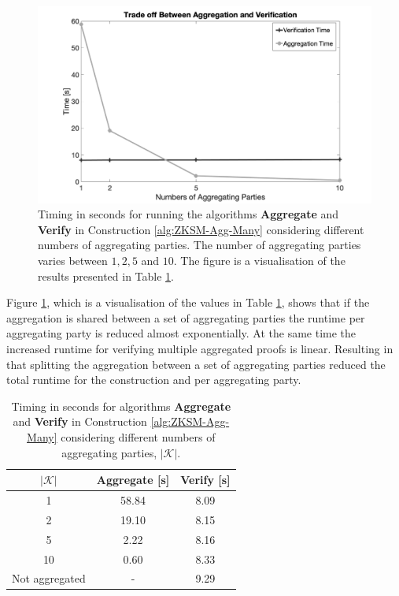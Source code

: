  \begin{figure}[]
\includegraphics[width=\linewidth]{./figure/trade-off.png}
\caption{Timing in seconds for running the algorithms  \textbf{Aggregate} and \textbf{Verify} in Construction \ref{alg:ZKSM-Agg-Many} considering different numbers of aggregating parties. The number of aggregating parties varies between $1,2,5$ and $10$. The figure is a visualisation of the results presented in Table \ref{tab:tradeoff}. }
\label{fig:tradeoff}
\end{figure}

Figure \ref{fig:tradeoff}, which is a visualisation of the values in Table \ref{tab:tradeoff},  shows that if the aggregation is shared between a set of aggregating parties the runtime per aggregating party is reduced almost exponentially. At the same time the increased runtime for verifying multiple aggregated proofs is linear. Resulting in that splitting the aggregation between a set of aggregating parties reduced the total runtime for the construction and per aggregating party.



\begin{table}
\centering
\caption{Timing in seconds for algorithms  \textbf{Aggregate} and \textbf{Verify} in Construction \ref{alg:ZKSM-Agg-Many} considering different numbers of aggregating parties, $|\mathcal{K}|$.
 }
\begin{tabular}{c | c c}
\toprule
$|\mathcal{K}|$ &  \textbf{Aggregate} [s] & \textbf{Verify} [s]\\	\midrule
  1					 							&   58.84 	&	8.09\\ 
  2												&   19.10 	&	8.15\\ 
  5												&   2.22 	& 8.16\\
  10												&   0.60 	& 8.33\\ \cdashline{1-3}
  Not aggregated												&   -	& 9.29\\ 
  \bottomrule 
\end{tabular}
 \label{tab:tradeoff}
\end{table}




